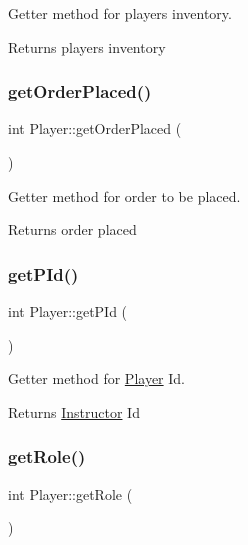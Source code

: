 Getter method for player\textquotesingle{}s inventory. 

\begin{DoxyReturn}{Returns}
player\textquotesingle{}s inventory 
\end{DoxyReturn}
\mbox{\label{class_player_af838b44639ee94d4185917d5d2259ce2}} 
\subsubsection{\texorpdfstring{get\+Order\+Placed()}{getOrderPlaced()}}
{\footnotesize\ttfamily int Player\+::get\+Order\+Placed (\begin{DoxyParamCaption}{ }\end{DoxyParamCaption})}



Getter method for order to be placed. 

\begin{DoxyReturn}{Returns}
order placed 
\end{DoxyReturn}
\mbox{\label{class_player_ad815840dfa1c1261900774b5ffd886e3}} 
\subsubsection{\texorpdfstring{get\+P\+Id()}{getPId()}}
{\footnotesize\ttfamily int Player\+::get\+P\+Id (\begin{DoxyParamCaption}{ }\end{DoxyParamCaption})}



Getter method for \hyperlink{class_player}{Player} Id. 

\begin{DoxyReturn}{Returns}
\hyperlink{class_instructor}{Instructor} Id 
\end{DoxyReturn}
\mbox{\label{class_player_a6baeff2a6218449299cb334c01f1dc28}} 
\subsubsection{\texorpdfstring{get\+Role()}{getRole()}}
{\footnotesize\ttfamily int Player\+::get\+Role (\begin{DoxyParamCaption}{ }\end{DoxyParamCaption})}



